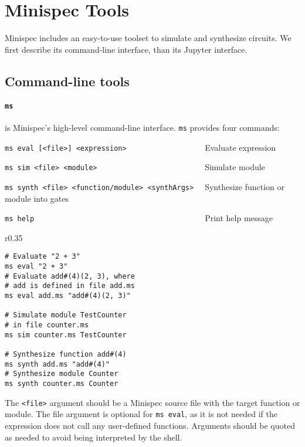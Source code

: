 \section{Minispec Tools}
\label{sec:tools}

Minispec includes an easy-to-use toolset to simulate and synthesize circuits.
We first describe its command-line interface, than its Jupyter interface.

\subsection{Command-line tools}
\label{sec:cli}

\paragraph{\texttt{ms}} is Minispec's high-level command-line interface. \texttt{ms} provides four commands:
\begin{compactitem}
\item \verb|ms eval [<file>] <expression>                  | Evaluate expression
\item \verb|ms sim <file> <module>                         | Simulate module
\item \verb|ms synth <file> <function/module> <synthArgs>  | Synthesize function or module into gates
\item \verb|ms help                                        | Print help message
\end{compactitem}
\begin{wrapfigure}{r}{0.35\columnwidth}
\vspace{-1.5em}
\begin{verbatim}
# Evaluate "2 + 3"
ms eval "2 + 3"
# Evaluate add#(4)(2, 3), where
# add is defined in file add.ms
ms eval add.ms "add#(4)(2, 3)"

# Simulate module TestCounter
# in file counter.ms
ms sim counter.ms TestCounter

# Synthesize function add#(4)
ms synth add.ms "add#(4)"
# Synthesize module Counter
ms synth counter.ms Counter
\end{verbatim}
\vspace{-4em}
\end{wrapfigure}

The \verb|<file>| argument should be a Minispec source file with the target function or module.
The file argument is optional for \verb|ms eval|, as it is not needed if the expression does not
call any user-defined functions.
Arguments should be quoted as needed to avoid being interpreted by the shell.

